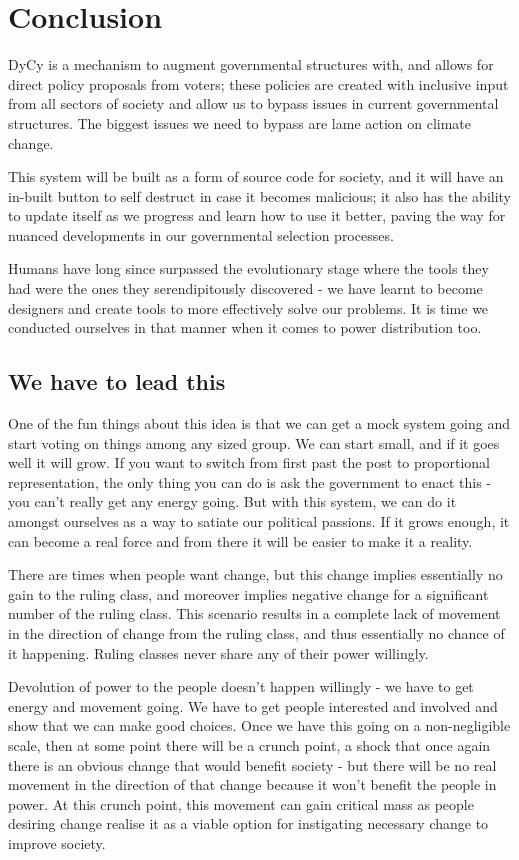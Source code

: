 \documentclass[twoside]{article}
\theoremstyle{definition}
\begin{document}
\section{Conclusion}

DyCy is a mechanism to augment governmental structures with, and allows for direct policy proposals from voters; these policies are created with inclusive input from all sectors of society and allow us to bypass issues in current governmental structures. The biggest issues we need to bypass are lame action on climate change.

This system will be built as a form of source code for society, and it will have an in-built button to self destruct in case it becomes malicious; it also has the ability to update itself as we progress and learn how to use it better, paving the way for nuanced developments in our governmental selection processes.

Humans have long since surpassed the evolutionary stage where the tools they had were the ones they serendipitously discovered - we have learnt to become designers and create tools to more effectively solve our problems. It is time we conducted ourselves in that manner when it comes to power distribution too.

\subsection{We have to lead this}

One of the fun things about this idea is that we can get a mock system going and start voting on things among any sized group. We can start small, and if it goes well it will grow. If you want to switch from first past the post to proportional representation, the only thing you can do is ask the government to enact this - you can’t really get any energy going. But with this system, we can do it amongst ourselves as a way to satiate our political passions. If it grows enough, it can become a real force and from there it will be easier to make it a reality.

There are times when people want change, but this change implies essentially no gain to the ruling class, and moreover implies negative change for a significant number of the ruling class. This scenario results in a complete lack of movement in the direction of change from the ruling class, and thus essentially no chance of it happening. Ruling classes never share any of their power willingly.

Devolution of power to the people doesn’t happen willingly - we have to get energy and movement going. We have to get people interested and involved and show that we can make good choices. Once we have this going on a non-negligible scale, then at some point there will be a crunch point, a shock that once again there is an obvious change that would benefit society - but there will be no real movement in the direction of that change because it won’t benefit the people in power. At this crunch point, this movement can gain critical mass as people desiring change realise it as a viable option for instigating necessary change to improve society.
\end{document}
